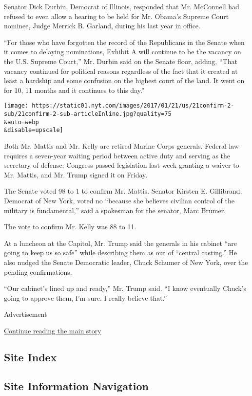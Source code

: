 Senator Dick Durbin, Democrat of Illinois, responded that Mr. McConnell
had refused to even allow a hearing to be held for Mr. Obama's Supreme
Court nominee, Judge Merrick B. Garland, during his last year in office.

``For those who have forgotten the record of the Republicans in the
Senate when it comes to delaying nominations, Exhibit A will continue to
be the vacancy on the U.S. Supreme Court,'' Mr. Durbin said on the
Senate floor, adding, ``That vacancy continued for political reasons
regardless of the fact that it created at least a hardship and some
confusion on the highest court of the land. It went on for 10, 11 months
and it continues to this day.''

\texttt{[image: https://static01.nyt.com/images/2017/01/21/us/21confirm-2-sub/21confirm-2-sub-articleInline.jpg?quality=75\\\&auto=webp\\\&disable=upscale]}

Both Mr. Mattis and Mr. Kelly are retired Marine Corps generals. Federal
law requires a seven-year waiting period between active duty and serving
as the secretary of defense; Congress passed legislation last week
granting a waiver to Mr. Mattis, and Mr. Trump signed it on Friday.

The Senate voted 98 to 1 to confirm Mr. Mattis. Senator Kirsten E.
Gillibrand, Democrat of New York, voted no ``because she believes
civilian control of the military is fundamental,'' said a spokesman for
the senator, Marc Brumer.

The vote to confirm Mr. Kelly was 88 to 11.

At a luncheon at the Capitol, Mr. Trump said the generals in his cabinet
``are going to keep us so safe'' while describing them as out of
``central casting.'' He also nudged the Senate Democratic leader, Chuck
Schumer of New York, over the pending confirmations.

``Our cabinet's lined up and ready,'' Mr. Trump said. ``I know
eventually Chuck's going to approve them, I'm sure. I really believe
that.''

Advertisement

\protect\hyperlink{after-bottom}{Continue reading the main story}

\hypertarget{site-index}{%
\subsection{Site Index}\label{site-index}}

\hypertarget{site-information-navigation}{%
\subsection{Site Information
Navigation}\label{site-information-navigation}}

